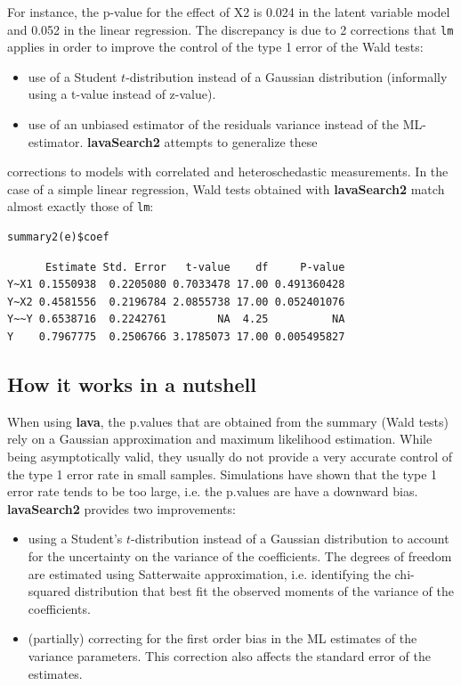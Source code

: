 \documentclass[12pt]{article}
\begin{document}
For instance, the p-value for the effect of X2 is 0.024 in the latent
variable model and 0.052 in the linear regression. The discrepancy is
due to 2 corrections that \texttt{lm} applies in order to improve the control
of the type 1 error of the Wald tests:
\begin{itemize}
\item use of a Student \(t\)-distribution instead of a Gaussian
distribution (informally using a t-value instead of z-value).
\item use of an unbiased estimator of the residuals variance instead of
the ML-estimator.  \textbf{lavaSearch2} attempts to generalize these
\end{itemize}
corrections to models with correlated and heteroschedastic
measurements. In the case of a simple linear regression, Wald tests
obtained with \textbf{lavaSearch2} match almost exactly those of \texttt{lm}:
\lstset{language=r,label= ,caption= ,captionpos=b,numbers=none}
\begin{lstlisting}
summary2(e)$coef
\end{lstlisting}

\begin{verbatim}
      Estimate Std. Error   t-value    df     P-value
Y~X1 0.1550938  0.2205080 0.7033478 17.00 0.491360428
Y~X2 0.4581556  0.2196784 2.0855738 17.00 0.052401076
Y~~Y 0.6538716  0.2242761        NA  4.25          NA
Y    0.7967775  0.2506766 3.1785073 17.00 0.005495827
\end{verbatim}

\subsection{How it works in a nutshell}
\label{sec:org62acd58}

When using \textbf{lava}, the p.values that are obtained from the summary
(Wald tests) rely on a Gaussian approximation and maximum likelihood
estimation. While being asymptotically valid, they usually do not
provide a very accurate control of the type 1 error rate in small
samples. Simulations have shown that the type 1 error rate tends to be
too large, i.e. the p.values are have a downward bias. \textbf{lavaSearch2}
provides two improvements:
\begin{itemize}
\item using a Student's \(t\)-distribution instead of a Gaussian
distribution to account for the uncertainty on the variance of the
coefficients. The degrees of freedom are estimated using Satterwaite
approximation, i.e. identifying the chi-squared distribution that
best fit the observed moments of the variance of the coefficients.
\item (partially) correcting for the first order bias in the ML estimates
of the variance parameters. This correction also affects the
standard error of the estimates.
\end{itemize}
\end{document}
